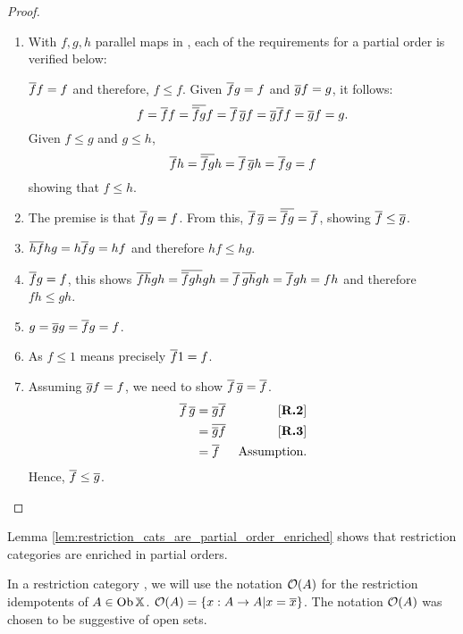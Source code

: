 \begin{proof}
  \prepprooflist
  \begin{enumerate}[{(}i{)}]
    \item With $f,g,h$ parallel maps in \X, each of the requirements for a partial order is
    verified below:
    \begin{description}
       $\overline{f} f = f$ and therefore, $ f \le f$.
       Given $\overline{f}g = f$ and $\overline{g}f = g$, it follows:
        \[
          f = \overline{f} f = \overline{\overline{f} g} f = \overline{f}\, \overline{g} f
          = \overline{g}\overline{f} f =  \overline{g} f = g.
        \]
       Given $f \le g$ and $g\le h$,
        \[
          \overline{f} h = \overline{\overline{f} g} h = \overline{f}\, \overline{g} h = \overline{f} g = f
        \]
        showing that $f \le h$.
    \end{description}
    \item The premise is that $\overline{f} g = f$. From this, $ \overline{f}\, \overline{g} =
      \overline{\overline{f} g} = \overline{f}$, showing $\overline{f} \le \overline{g}$.
    \item $\overline{h f} hg = h \overline{f} g = h f$  and therefore $h f \le hg$.
    \item $\overline{f} g = f$, this shows $\overline{f h} g h = \overline{\overline{f} g h} g h
      = \overline{f}\, \overline{g h} g h = \overline{f} g h = f h$ and therefore $f h \le g h$.
    \item $g = \overline{g} g = \overline{f} g = f$.
    \item As $f \le 1$ means precisely $\overline{f}1 = f$.
    \item Assuming $\overline{g} f = f$, we need to show $\overline{f}\, \overline{g} = \overline{f}$.
      \begin{align*}
        \overline{f}\,\overline{g} &= \overline{g}\overline{f} & [\text{\bfseries {R}.{2}}] \\
        & = \overline{\overline{g} f} & [\text{\bfseries {R}.{3}}] \\
        & = \overline{f} & \text{Assumption}.
      \end{align*}
      Hence, $\overline{f} \le \overline{g}$.
  \end{enumerate}
\end{proof}

Lemma \vref{lem:restriction_cats_are_partial_order_enriched} shows that restriction
categories are enriched in partial orders.

In a restriction category \X, we will use the notation $\mathcal{O}({A})$ for the restriction idempotents
of $A\in \operatorname{Ob}{\mathbb{X}}$. $\mathcal{O}({A}) = \{x:A\to A| x = \overline{x}\}$. The notation $\mathcal{O}({A})$ was chosen
to be suggestive of open sets.

